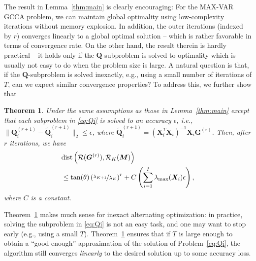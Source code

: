 \documentclass[10pt,journal]{IEEEtran}
\newtheorem{Theorem}{Theorem}
\newtheorem{Remark}{Remark}
\newcommand{\G}{\boldsymbol{G}}
\newcommand{\Q}{\boldsymbol{Q}}
\newcommand{\X}{\boldsymbol{X}}
\begin{document}
The result in Lemma~\ref{thm:main} is clearly encouraging: For the MAX-VAR GCCA problem, we can maintain global optimality using low-complexity iterations without memory explosion.
In addition, the outer iterations (indexed by $r$) converges linearly to a global optimal solution -- which is rather favorable in terms of convergence rate. 
On the other hand, the result therein is hardly practical -- it holds only if the ${\bm Q}$-subproblem is solved to optimality which is usually not easy to do when the problem size is large. 
A natural question is that, if the ${\bm Q}$-subproblem is solved inexactly, e.g., using a small number of iterations of $T$, can we expect similar convergence properties?
To address this, we further show that
\begin{Theorem} \label{thm:main_2}
Under the same assumptions as those in Lemma~\ref{thm:main} except that each subproblem in \eqref{eq:Qi} is solved to an accuracy $\epsilon$, i.e., $\|\Q_i^{(r+1)}-\tilde{\Q}_i^{(r+1)}\|_2 \leq \epsilon$, where $\tilde{\Q}_i^{(r+1)}=(\X_i^T\X_i)^{-1}\X_i\G^{(r)}$. Then, after $r$ iterations, we have
\begin{align}
   &{\rm dist}\left({\cal R}({\bm G}^{(r)}),{\cal R}_K({\bm M})\right) \nonumber\\
   &\leq \tan(\theta)\left(\nicefrac{\lambda_{K+1}}{\lambda_K}\right)^r + C\left(\sum_{i=1}^I\lambda_{\max}(\X_i)\epsilon\right) ,
\end{align}
where $C$ is a constant.
\end{Theorem}
Theorem~\ref{thm:main_2} makes much sense for inexact alternating optimization: in practice, solving the subproblem in \eqref{eq:Qi} is not an easy task, and one may want to stop early (e.g., using a small $T$).
Theorem~\ref{thm:main_2} ensures that if $T$ is large enough to obtain a ``good enough'' approximation
of the solution of Problem~\eqref{eq:Qi}, the algorithm still converges \textit{linearly} to the desired solution up to some accuracy loss.
%
\end{document}

